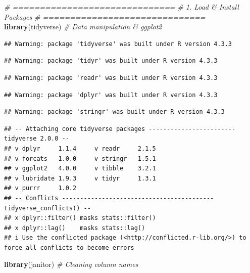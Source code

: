 \documentclass[
]{article}
\newenvironment{Shaded}{\begin{snugshade}}{\end{snugshade}}
\newcommand{\CommentTok}[1]{\textcolor[rgb]{0.56,0.35,0.01}{\textit{#1}}}
\newcommand{\FunctionTok}[1]{\textcolor[rgb]{0.13,0.29,0.53}{\textbf{#1}}}
\newcommand{\NormalTok}[1]{#1}
\begin{document}
\begin{Shaded}
\begin{Highlighting}[]
\CommentTok{\# ==============================}
\CommentTok{\# 1. Load \& Install Packages}
\CommentTok{\# ==============================}
\FunctionTok{library}\NormalTok{(tidyverse)    }\CommentTok{\# Data manipulation \& ggplot2}
\end{Highlighting}
\end{Shaded}

\begin{verbatim}
## Warning: package 'tidyverse' was built under R version 4.3.3
\end{verbatim}

\begin{verbatim}
## Warning: package 'tidyr' was built under R version 4.3.3
\end{verbatim}

\begin{verbatim}
## Warning: package 'readr' was built under R version 4.3.3
\end{verbatim}

\begin{verbatim}
## Warning: package 'dplyr' was built under R version 4.3.3
\end{verbatim}

\begin{verbatim}
## Warning: package 'stringr' was built under R version 4.3.3
\end{verbatim}

\begin{verbatim}
## -- Attaching core tidyverse packages ------------------------ tidyverse 2.0.0 --
## v dplyr     1.1.4     v readr     2.1.5
## v forcats   1.0.0     v stringr   1.5.1
## v ggplot2   4.0.0     v tibble    3.2.1
## v lubridate 1.9.3     v tidyr     1.3.1
## v purrr     1.0.2     
## -- Conflicts ------------------------------------------ tidyverse_conflicts() --
## x dplyr::filter() masks stats::filter()
## x dplyr::lag()    masks stats::lag()
## i Use the conflicted package (<http://conflicted.r-lib.org/>) to force all conflicts to become errors
\end{verbatim}

\begin{Shaded}
\begin{Highlighting}[]
\FunctionTok{library}\NormalTok{(janitor)      }\CommentTok{\# Cleaning column names}
\end{Highlighting}
\end{Shaded}
\end{document}
